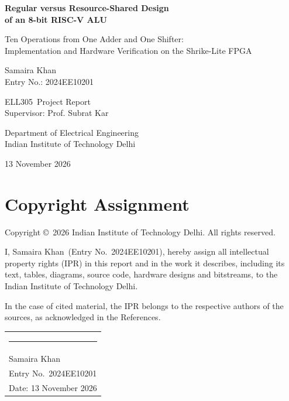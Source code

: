 \documentclass[12pt,a4paper,twoside]{article}
\newcommand{\studentname}{Samaira Khan}
\newcommand{\entrynumber}{2024EE10201}
\newcommand{\coursecode}{ELL305}
\newcommand{\supervisor}{Prof. Subrat Kar}
\begin{document}
\begin{titlepage}
\centering
\vspace*{2cm}
{\LARGE\bfseries Regular versus Resource-Shared Design\\[4pt]
of an 8-bit RISC-V ALU\par}
\vspace{0.8cm}
{\large Ten Operations from One Adder and One Shifter:\\
Implementation and Hardware Verification on the Shrike-Lite FPGA\par}
\vspace{2.5cm}
{\large \studentname\\[2pt] Entry No.: \entrynumber\par}
\vspace{1cm}
{\large \coursecode\ Project Report\\[2pt] Supervisor: \supervisor\par}
\vfill
{\large Department of Electrical Engineering\\
Indian Institute of Technology Delhi\par}
\vspace{0.6cm}
{\large 13 November 2026\par}
\end{titlepage}

\setcounter{page}{2}
\section*{Copyright Assignment}
\thispagestyle{plain}

\noindent Copyright \copyright\ 2026 Indian Institute of Technology Delhi. All rights
reserved.

\medskip
\noindent I, \studentname\ (Entry No.\ \entrynumber), hereby assign all intellectual
property rights (IPR) in this report and in the work it describes, including its
text, tables, diagrams, source code, hardware designs and bitstreams, to the Indian
Institute of Technology Delhi.

\medskip
\noindent In the case of cited material, the IPR belongs to the respective authors of
the sources, as acknowledged in the References.

\vspace{2cm}
\noindent\begin{tabular}{@{}l@{}}
\rule{6cm}{0.4pt}\\
\studentname\\
Entry No.\ \entrynumber\\
Date: 13 November 2026
\end{tabular}
\end{document}
